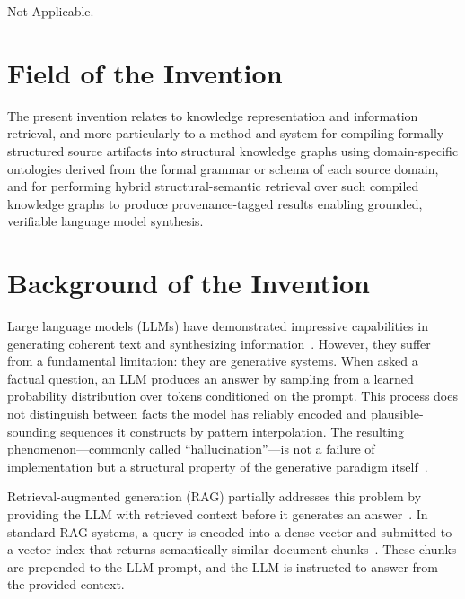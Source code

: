 \documentclass[12pt]{article}
\begin{document}
Not Applicable.

\section*{Field of the Invention}

The present invention relates to knowledge representation and information
retrieval, and more particularly to a method and system for compiling
formally-structured source artifacts into structural knowledge graphs using
domain-specific ontologies derived from the formal grammar or schema of each
source domain, and for performing hybrid structural-semantic retrieval over such
compiled knowledge graphs to produce provenance-tagged results enabling grounded,
verifiable language model synthesis.

\section*{Background of the Invention}

Large language models (LLMs) have demonstrated impressive capabilities in
generating coherent text and synthesizing information~\cite{brown2020gpt3,
chowdhery2022palm, touvron2023llama}. However, they suffer from a fundamental
limitation: they are generative systems. When asked a factual question, an LLM
produces an answer by sampling from a learned probability distribution over
tokens conditioned on the prompt. This process does not distinguish between facts
the model has reliably encoded and plausible-sounding sequences it constructs by
pattern interpolation. The resulting phenomenon---commonly called
``hallucination''---is not a failure of implementation but a structural property
of the generative paradigm itself~\cite{ji2023hallucinationsurvey,
maynez2020faithfulness}.

Retrieval-augmented generation (RAG) partially addresses this problem by
providing the LLM with retrieved context before it generates an
answer~\cite{lewis2020rag, guu2020realm}. In standard RAG systems, a query is
encoded into a dense vector and submitted to a vector index that returns
semantically similar document chunks~\cite{johnson2021faiss, karpukhin2020dpr}.
These chunks are prepended to the LLM prompt, and the LLM is instructed to
answer from the provided context.
\end{document}
